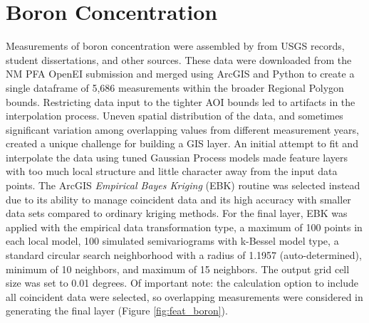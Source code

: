 \section{Boron Concentration}\label{app:dl_boron}
Measurements of boron concentration were assembled by \citet{bielicki_hydrogeolgic_2015} from USGS records, student dissertations, and other sources. These data were downloaded from the NM PFA OpenEI submission \citep{kelley_geothermal_2015} and merged using ArcGIS and Python to create a single dataframe of 5,686 measurements within the broader Regional Polygon bounds. Restricting data input to the tighter AOI bounds led to artifacts in the interpolation process. Uneven spatial distribution of the data, and sometimes significant variation among overlapping values from different measurement years, created a unique challenge for building a GIS layer. An initial attempt to fit and interpolate the data using tuned Gaussian Process models made feature layers with too much local structure and little character away from the input data points. The ArcGIS \textit{Empirical Bayes Kriging} (EBK) routine was selected instead due to its ability to manage coincident data and its high accuracy with smaller data sets compared to ordinary kriging methods. For the final layer, EBK was applied with the empirical data transformation type, a maximum of 100 points in each local model, 100 simulated semivariograms with k-Bessel model type, a standard circular search neighborhood with a radius of 1.1957 (auto-determined), minimum of 10 neighbors, and maximum of 15 neighbors. The output grid cell size was set to 0.01 degrees. Of important note: the calculation option to include all coincident data were selected, so overlapping measurements were considered in generating the final layer (Figure \ref{fig:feat_boron}).
\vfill
\pagebreak

